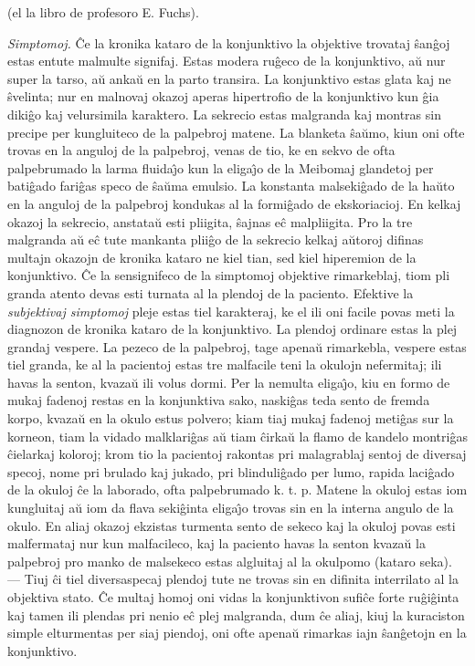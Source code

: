 \begin{center}
\footnotesize (el la libro de profesoro E. Fuchs).
\end{center}

{\sl Simptomoj.} \^Ce la kronika kataro de la konjunktivo la
objektive trovataj \^san\^goj estas entute malmulte signifaj. Estas
modera ru\^geco de la konjunktivo, a\u u nur super la tarso, a\u u
anka\u u en la parto transira. La konjunktivo estas glata kaj ne
\^svelinta; nur en malnovaj okazoj aperas hipertrofio de la
konjunktivo kun \^gia diki\^go kaj velursimila karaktero. La
sekrecio estas malgranda kaj montras sin precipe per kungluiteco de
la palpebroj matene. La blanketa \^sa\u umo, kiun oni ofte trovas en
la anguloj de la palpebroj, venas de tio, ke en sekvo de ofta
palpebrumado la larma fluida\^{\j}o kun la eliga\^{\j}o de la
Meibomaj glandetoj per bati\^gado fari\^gas speco de \^sa\u uma
emulsio. La konstanta malseki\^gado de la ha\u uto en la anguloj de
la palpebroj kondukas al la formi\^gado de ekskoriacioj. En kelkaj
okazoj la sekrecio, anstata\u u esti pliigita, \^sajnas e\^c
malpliigita. Pro la tre malgranda a\u u e\^c tute mankanta plii\^go
de la sekrecio kelkaj a\u utoroj difinas multajn okazojn de kronika
kataro ne kiel tian, sed kiel hiperemion de la konjunktivo. \^Ce la
sensignifeco de la simptomoj objektive rimarkeblaj, tiom pli granda
atento devas esti turnata al la plendoj de la paciento. Efektive la
{\sl subjektivaj simptomoj} pleje estas tiel karakteraj, ke el ili
oni facile povas meti la diagnozon de kronika kataro de la
konjunktivo. La plendoj ordinare estas la plej grandaj vespere. La
pezeco de la palpebroj, tage apena\u u rimarkebla, vespere estas
tiel granda, ke al la pacientoj estas tre malfacile teni la okulojn
nefermitaj; ili havas la senton, kvaza\u u ili volus dormi. Per la
nemulta eliga\^{\j}o, kiu en formo de mukaj fadenoj restas en la
konjunktiva sako, naski\^gas teda sento de fremda korpo, kvaza\u u
en la okulo estus polvero; kiam tiaj mukaj fadenoj meti\^gas sur la
korneon, tiam la vidado malklari\^gas a\u u tiam \^cirka\u u la
flamo de kandelo montri\^gas \^cielarkaj koloroj; krom tio la
pacientoj rakontas pri malagrablaj sentoj de diversaj specoj, nome
pri brulado kaj jukado, pri blinduli\^gado per lumo, rapida
laci\^gado de la okuloj \^ce la laborado, ofta palpebrumado k. t. p.
Matene la okuloj estas iom kungluitaj a\u u iom da flava seki\^ginta
eliga\^{\j}o trovas sin en la interna angulo de la okulo. En aliaj
okazoj ekzistas turmenta sento de sekeco kaj la okuloj povas esti
malfermataj nur kun malfacileco, kaj la paciento havas la senton
kvaza\u u la palpebroj pro manko de malsekeco estas algluitaj al la
okulpomo (kataro seka). --- Tiuj \^ci tiel diversaspecaj plendoj
tute ne trovas sin en difinita interrilato al la objektiva stato.
\^Ce multaj homoj oni vidas la konjunktivon sufi\^ce forte
ru\^gi\^ginta kaj tamen ili plendas pri nenio e\^c plej malgranda,
dum \^ce aliaj, kiuj la kuraciston simple elturmentas per siaj
piendoj, oni ofte apena\u u rimarkas iajn \^san\^getojn en la
konjunktivo.

